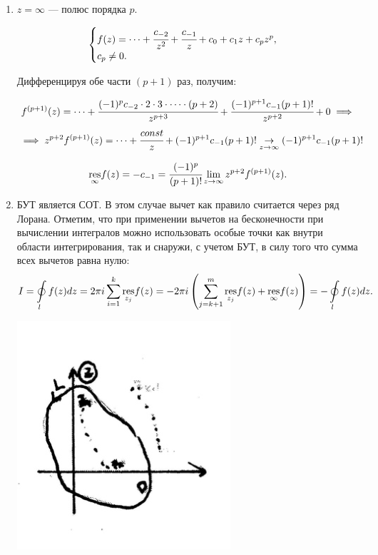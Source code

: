 \documentclass[../../main.tex]{subfiles}
\begin{document}
\begin{itemize}
\begin{enumerate}
	 	\item
	 	$z=\infty$ --- полюс порядка $p$.
	 	
	 	\[
	 	\begin{cases}
	 	f(z)=\dots+\cfrac{c_{-2}}{z^2}+\cfrac{c_{-1}}{z}+c_0+c_1z+c_pz^p,\\
	 	c_p\neq0.
	 	\end{cases}
	 	\]
	 	
	 	Дифференцируя обе части $(p+1)$ раз, получим:
	 	
	 	\[
	 	f^{(p+1)}(z)=\dots+\cfrac{(-1)^{p}c_{-2}\cdot2\cdot3\cdot\dots 
	 	\cdot(p+2)}{z^{p+3}}+\cfrac{(-1)^{p+1}c_{-1}(p+1)!}{z^{p+2}}+0\implies\]
	 	\[\implies
	 	z^{p+2}f^{(p+1)}(z)=\dots+\cfrac{const}{z}+(-1)^{p+1}c_{-1}(p+1)! 
	 	\underset{z\rightarrow \infty}{\rightarrow}(-1)^{p+1}c_{-1}(p+1)!
	 	\]
	 	
	 	\begin{equation}
	 	\underset{\infty}{\operatorname{res}}f(z)=-c_{-1}=\cfrac{(-1)^p}{(p+1)!} 
	 	\lim\limits_{z\rightarrow\infty}z^{p+2}f^{(p+1)}(z).
	 	\end{equation}
	 	
	 	\item
	 	БУТ является СОТ. В этом случае вычет как правило считается через ряд 
	 	Лорана. 
	 	Отметим, что при применении вычетов на бесконечности при вычислении 
	 	интегралов можно использовать особые точки как внутри области 
	 	интегрирования, так и снаружи, с учетом БУТ, в силу того что сумма всех 
	 	вычетов равна нулю:
	 	\[
	 	I=\oint\limits_lf(z)dz=2\pi i \sum_{i=1}^{k}\underset{z_j}{\operatorname{res}}f(z)=-2\pi 
	 	i\left(\sum_{j=k+1}^{m}\underset{z_j}{\operatorname{res}}f(z)+\underset{\infty}{\operatorname{res}}f(z)
	 	\right)=-\oint\limits_lf(z)dz.
	 	\]
	 	\begin{center}
	 	\includegraphics{lec35_2}
	 	\end{center}
	 \end{enumerate}
	 \end{itemize}
	 
\end{document}
